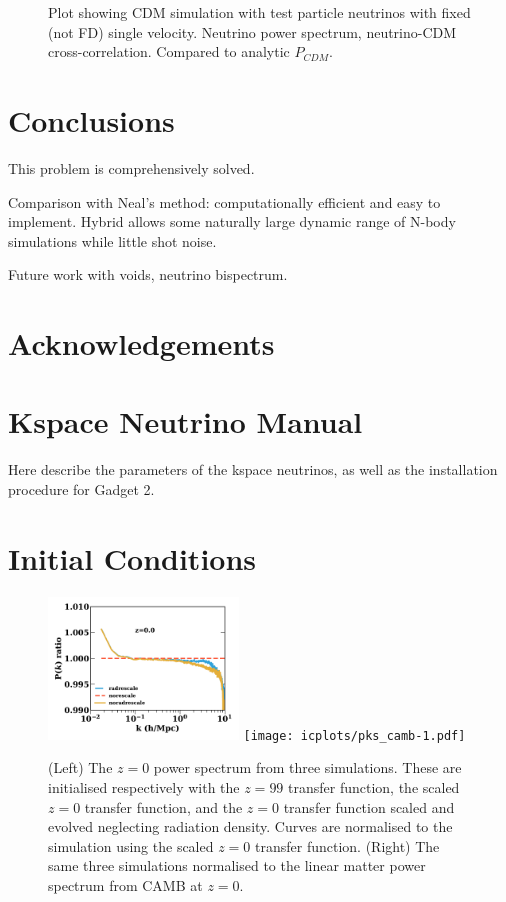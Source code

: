 \documentclass[useAMS, usenatbib]{mnras}
\begin{document}
\begin{figure}
    \caption{Plot showing CDM simulation with test particle neutrinos with fixed (not FD) single velocity.
  Neutrino power spectrum, neutrino-CDM cross-correlation. Compared to analytic $P_{CDM}$.}
  \label{fig:testpart}
\end{figure}


\section{Conclusions}
\label{sec:conclusion}

This problem is comprehensively solved.

Comparison with Neal's method:
computationally efficient and easy to implement.
Hybrid allows some naturally large dynamic range of N-body simulations while little shot noise.

Future work with voids, neutrino bispectrum.

\section*{Acknowledgements}

\appendix

\section{Kspace Neutrino Manual}
\label{sec:manual}

Here describe the parameters of the kspace neutrinos,
as well as the installation procedure for Gadget 2.

\section{Initial Conditions}
\label{sec:initcond}

\begin{figure}
\includegraphics[width=0.45\textwidth]{icplots/pks_rel-1.pdf}
\texttt{[image: icplots/pks\_camb-1.pdf]}
  \caption{(Left) The $z=0$ power spectrum from three simulations.
  These are initialised respectively with the $z=99$ transfer function,
  the scaled $z=0$ transfer function, and the $z=0$ transfer function
  scaled and evolved neglecting radiation density.
  Curves are normalised to the simulation using the scaled $z=0$ transfer function.
  (Right) The same three simulations normalised to the linear matter
  power spectrum from CAMB at $z=0$.}
  \label{fig:rescaling}
\end{figure}
\end{document}

